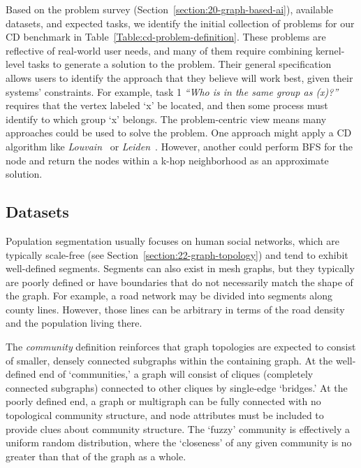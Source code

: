 Based on the problem survey (Section~\ref{section:20-graph-based-ai}), available datasets, and expected tasks, we identify the initial collection of problems for our \ac{CD} benchmark in Table~\ref{Table:cd-problem-definition}.
These problems are reflective of real-world user needs, and many of them require combining kernel-level tasks to generate a solution to the problem.
Their general specification allows users to identify the approach that they believe will work best, given their systems' constraints. 
For example, task 1 \textit{``Who is in the same group as (x)?''} requires that the vertex labeled `x' be located, and then some process must identify to which group `x' belongs. 
The problem-centric view means many approaches could be used to solve the problem. 
One approach might apply a \ac{CD} algorithm like \textit{Louvain}~\cite{Blondel2008} or \textit{Leiden}~\cite{Traag2019}. 
However, another could perform \ac{BFS} for the node and return the nodes within a k-hop neighborhood as an approximate solution.



\subsection{Datasets}
Population segmentation usually focuses on human social networks, which are typically scale-free (see Section~\ref{section:22-graph-topology}) and tend to exhibit well-defined segments.
Segments can also exist in mesh graphs, but they typically are poorly defined or have boundaries that do not necessarily match the shape of the graph. 
For example, a road network may be divided into segments along county lines. 
However, those lines can be arbitrary in terms of the road density and the population living there. 

The \textit{community} definition reinforces that graph topologies are expected to consist of smaller, densely connected subgraphs within the containing graph.
At the well-defined end of `communities,' a graph will consist of cliques (completely connected subgraphs) connected to other cliques by single-edge `bridges.' 
At the poorly defined end, a graph or multigraph can be fully connected with no topological community structure, and node attributes must be included to provide clues about community structure. 
The `fuzzy' community is effectively a uniform random distribution, where the `closeness' of any given community is no greater than that of the graph as a whole.


